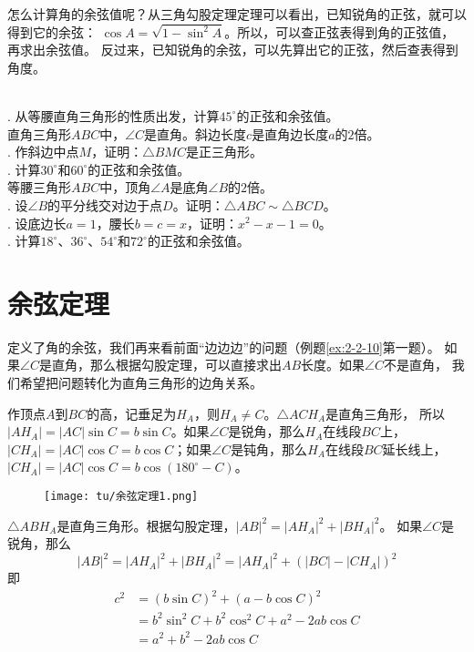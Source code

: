\documentclass[12pt,UTF8]{ctexbook}
\begin{document}
怎么计算角的余弦值呢？从三角勾股定理定理可以看出，已知锐角的正弦，就可以得到它的余弦：
$\cos A = \sqrt{1 - \sin^2 A}$。所以，可以查正弦表得到角的正弦值，再求出余弦值。
反过来，已知锐角的余弦，可以先算出它的正弦，然后查表得到角度。

\begin{xt}
    \mbox{} \\
    . 从等腰直角三角形的性质出发，计算$45^\circ$的正弦和余弦值。 \\
    直角三角形$ABC$中，$\angle C$是直角。斜边长度$c$是直角边长度$a$的$2$倍。 \\
    . 作斜边中点$M$，证明：$\triangle BMC$是正三角形。 \\
    . 计算$30^\circ$和$60^\circ$的正弦和余弦值。 \\
    等腰三角形$ABC$中，顶角$\angle A$是底角$\angle B$的$2$倍。 \\
    . 设$\angle B$的平分线交对边于点$D$。证明：$\triangle ABC \sim \triangle BCD$。 \\
    . 设底边长$a = 1$，腰长$b = c = x$，证明：$x^2 - x - 1 = 0$。 \\
    . 计算$18^\circ$、$36^\circ$、$54^\circ$和$72^\circ$的正弦和余弦值。
\end{xt}

\section{余弦定理}

定义了角的余弦，我们再来看前面“边边边”的问题（例题\ref{ex:2-2-10}第一题）。
如果$\angle C$是直角，那么根据勾股定理，可以直接求出$AB$长度。如果$\angle C$不是直角，
我们希望把问题转化为直角三角形的边角关系。

作顶点$A$到$BC$的高，记垂足为$H_A$，则$H_A \neq C$。$\triangle ACH_A$是直角三角形，
所以$|AH_A| = |AC|\sin C = b\sin C$。如果$\angle C$是锐角，那么$H_A$在线段$BC$上，
$|CH_A| = |AC|\cos C = b\cos C$；如果$\angle C$是钝角，那么$H_A$在线段$BC$延长线上，
$|CH_A| = |AC|\cos C = b\cos (180^\circ - C)$。

\begin{figure}[H] %
    \vspace{4pt}
    \centering
    \texttt{[image: tu/余弦定理1.png]}
\end{figure}

$\triangle ABH_A$是直角三角形。根据勾股定理，$|AB|^2 = |AH_A|^2 + |BH_A|^2 $。
如果$\angle C$是锐角，那么
$$ |AB|^2 = |AH_A|^2 + |BH_A|^2 = |AH_A|^2 + (|BC| - |CH_A|)^2$$
即
\begin{align*}
    c^2 &= (b\sin C)^2 + (a - b\cos C)^2  \\
    &= b^2\sin^2 C + b^2\cos^2 C + a^2 - 2ab\cos C  \\
    &= a^2 + b^2 - 2ab\cos C 
\end{align*}
\end{document}
